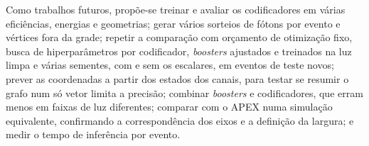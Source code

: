 { Como trabalhos futuros, propõe-se treinar e avaliar os codificadores em várias eficiências, energias e geometrias; gerar vários sorteios de fótons por evento e vértices fora da grade; repetir a comparação com orçamento de otimização fixo, busca de hiperparâmetros por codificador, \textit{boosters} ajustados e treinados na luz limpa e várias sementes, com e sem os escalares, em eventos de teste novos; prever as coordenadas a partir dos estados dos canais, para testar se resumir o grafo num só vetor limita a precisão; combinar \textit{boosters} e codificadores, que erram menos em faixas de luz diferentes; comparar com o APEX numa simulação equivalente, confirmando a correspondência dos eixos e a definição da largura; e medir o tempo de inferência por evento.\par}

